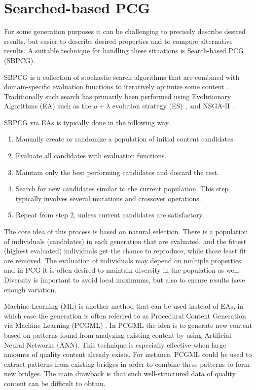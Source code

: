 \section{Searched-based PCG}

For some generation purposes it can be challenging to precisely describe desired results, but easier to describe desired properties and to compare alternative results.
A suitable technique for handling these situations is Search-based PCG (SBPCG).

SBPCG is a collection of stochastic search algorithms that are combined with domain-specific evaluation functions to iteratively optimize some content \cite{search_based_pcg} \cite{search_based_pcg2}.
Traditionally such search has primarily been performed using Evolutionary Algorithms (EA) such as the $\mu + \lambda$ evolution strategy (ES) \cite[p.18-20]{PCG_in_games}, and NSGA-II \cite{nsgaii}.

SBPCG via EAs is typically done in the following way.
\begin{enumerate}
  \item Manually create or randomize a population of initial content candidates.
  \item Evaluate all candidates with evaluation functions.
  \item Maintain only the best performing candidates and discard the rest.
  \item Search for new candidates similar to the current population. This step typically involves several mutations and crossover operations.
  \item Repeat from step 2, unless current candidates are satisfactory.
\end{enumerate}

The core idea of this process is based on natural selection.
There is a population of individuals (candidates) in each generation that are evaluated, and the fittest (highest evaluated) individuals get the chance to reproduce, while those least fit are removed.
The evaluation of individuals may depend on multiple properties and in PCG it is often desired to maintain diversity in the population as well.
Diversity is important to avoid local maximums, but also to ensure results have enough variation.

Machine Learning (ML) is another method that can be used instead of EAs, in which case the generation is often referred to as Procedural Content Generation via Machine Learning (PCGML) \cite{pcgml} \cite{pcgml2} \cite{pcgml3}.
In PCGML the idea is to generate new content based on patterns found from analyzing existing content by using Artificial Neural Networks (ANN).
This technique is especially effective when large amounts of quality content already exists.
For instance, PCGML could be used to extract patterns from existing bridges in order to combine these patterns to form new bridges.
The main drawback is that such well-structured data of quality content can be difficult to obtain.

